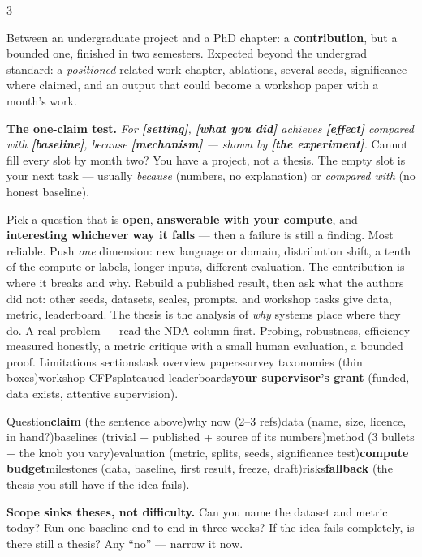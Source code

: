 \documentclass[10pt,a4paper]{article}
\begin{document}
\vspace{2pt}
\begin{multicols}{3}
\raggedright

Between an undergraduate project and a PhD chapter: a \textbf{contribution},
but a bounded one, finished in two semesters. Expected beyond the undergrad
standard: a \emph{positioned} related-work chapter, ablations, several seeds,
significance where claimed, and an output that could become a workshop paper
with a month's work.
\begin{flag}
\textbf{The one-claim test.} \emph{For \textbf{[setting]}, \textbf{[what you
did]} achieves \textbf{[effect]} compared with \textbf{[baseline]}, because
\textbf{[mechanism]} --- shown by \textbf{[the experiment]}.} Cannot fill every
slot by month two? You have a project, not a thesis. The empty slot is your
next task --- usually \emph{because} (numbers, no explanation) or
\emph{compared with} (no honest baseline).
\end{flag}

Pick a question that is \textbf{open}, \textbf{answerable with your compute},
and \textbf{interesting whichever way it falls} --- then a failure is still a
finding.
Most reliable. Push \emph{one} dimension: new language
or domain, distribution shift, a tenth of the compute or labels, longer
inputs, different evaluation. The contribution is where it breaks and why.
Rebuild a published result, then ask what the
authors did not: other seeds, datasets, scales, prompts.
 and
workshop tasks give data, metric, leaderboard. The thesis is the analysis of
\emph{why} systems place where they do.
A real problem --- read the NDA column first.
Probing, robustness, efficiency measured honestly, a
metric critique with a small human evaluation, a bounded proof.
Limitations sections\dt task overview
papers\dt survey taxonomies (thin boxes)\dt workshop CFPs\dt plateaued
leaderboards\dt \textbf{your supervisor's grant} (funded, data exists,
attentive supervision).

Question\dt \textbf{claim} (the sentence above)\dt why now (2--3 refs)\dt data
(name, size, licence, in hand?)\dt baselines (trivial + published + source of
its numbers)\dt method (3 bullets + the knob you vary)\dt evaluation (metric,
splits, seeds, significance test)\dt \textbf{compute budget}\dt milestones
(data, baseline, first result, freeze, draft)\dt risks\dt \textbf{fallback}
(the thesis you still have if the idea fails).
\begin{flag}
\textbf{Scope sinks theses, not difficulty.} Can you name the dataset and
metric today? Run one baseline end to end in three weeks? If the idea fails
completely, is there still a thesis? Any ``no'' --- narrow it now.
\end{flag}


\end{multicols}
\end{document}
